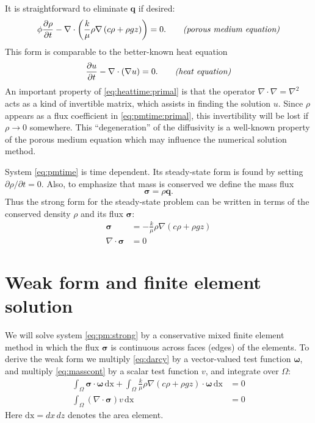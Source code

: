 \documentclass[11pt]{amsart}
\newcommand{\bq}{\mathbf{q}}
\newcommand{\bsigma}{\bm{\sigma}}
\newcommand{\bomega}{\bm{\omega}}
\newcommand{\dx}{\mathrm{dx}}
\newcommand{\Div}{\nabla\cdot}
\newcommand{\grad}{\nabla}
\begin{document}
It is straightforward to eliminate $\bq$ if desired:
\begin{equation}
\phi \frac{\partial \rho}{\partial t} - \Div \left(\frac{k}{\mu} \rho \grad\left(c \rho + \rho g z\right)\right) = 0.  \qquad \text{\emph{(porous medium equation)}} \label{eq:pmtime:primal}
\end{equation}
This form is comparable to the better-known heat equation
\begin{equation}
\frac{\partial u}{\partial t} - \Div(\grad u) = 0. \qquad \text{\emph{(heat equation)}}\label{eq:heattime:primal}
\end{equation}
An important property of \eqref{eq:heattime:primal} is that the operator $\Div \grad = \grad^2$ acts as a kind of invertible matrix, which assists in finding the solution $u$.  Since $\rho$ appears as a flux coefficient in \eqref{eq:pmtime:primal}, this invertibility will be lost if $\rho\to 0$ somewhere.  This ``degeneration'' of the diffusivity is a well-known property of the porous medium equation which may influence the numerical solution method.

System \eqref{eq:pmtime} is time dependent.  Its steady-state form is found by setting $\partial \rho/\partial t = 0$.  Also, to emphasize that mass is conserved we define the mass flux
	$$\bsigma = \rho \bq.$$
Thus the strong form for the steady-state problem can be written in terms of the conserved density $\rho$ and its flux $\bsigma$:
\begin{subequations}
\label{eq:pm:strong}
\begin{align}
\bsigma &= - \frac{k}{\mu} \rho \grad\left(c \rho + \rho g z\right) \label{eq:darcy} \\
\Div \bsigma &= 0 \label{eq:masscont}
\end{align}
\end{subequations}

\section{Weak form and finite element solution}

We will solve system \eqref{eq:pm:strong} by a conservative mixed finite element method \citep{Boffi2013} in which the flux $\bsigma$ is continuous across faces (edges) of the elements.  To derive the weak form we multiply \eqref{eq:darcy} by a vector-valued test function $\bomega$, and multiply \eqref{eq:masscont} by a scalar test function $v$, and integrate over $\Omega$:
\begin{subequations}
\label{eq:pm:prelim}
\begin{align}
\int_\Omega \bsigma\cdot \bomega\,\dx + \int_\Omega \frac{k}{\mu} \rho \grad\left(c \rho + \rho g z\right) \cdot \bomega\,\dx &= 0 \\
\int_\Omega (\Div \bsigma) v\,\dx &= 0
\end{align}
\end{subequations}
Here $\dx = dx\,dz$ denotes the area element.
\end{document}
